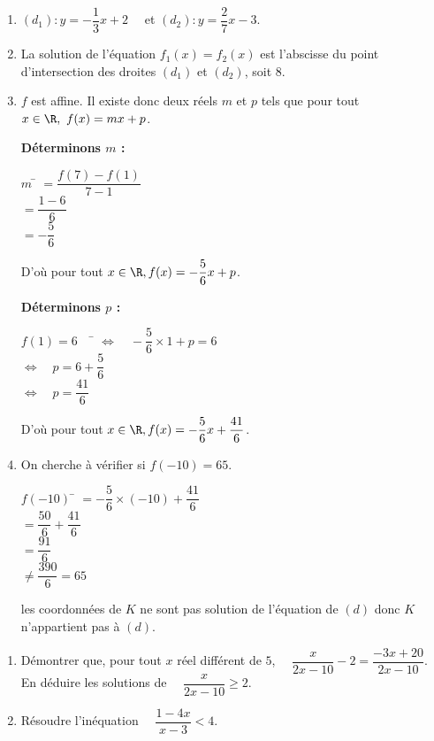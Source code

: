 \documentclass[a4paper,11pt,french]{article}
\begin{document}
\begin{exercicecorrection}
	\begin{enumerate}[\bfseries 1.]
		\item 	$(d_1):y=-\dfrac{1}{3}x+2 \quad$ et $(d_2):y=\dfrac{2}{7}x-3$.
		\item 	La solution de l'équation $f_1(x)=f_2(x)$ est l'abscisse du point d'intersection des droites $(d_1)$ et $(d_2)$, soit $8$.
		\item	$f$ est affine. Il existe donc deux réels $m$ et $p$ tels que pour tout $x\in\R, \ f(x)=mx+p$.
		\begin{multicols}{2}
			\textbf{Déterminons $m$ :}
			\begin{tabbing}
				$m$ 	\=  $=\dfrac{f(7)-f(1)}{7-1} $\\[.5em]
				\>  $= \dfrac{1-6}{6}$\\[.5em]
				\>	$= -\dfrac{5}{6}$
			\end{tabbing}
			D'où pour tout $x\in \R, f(x)=-\dfrac{5}{6}x+p$.
			
			\textbf{Déterminons $p$ :}
			\begin{tabbing}
				$f(1)=6 \quad$		\=	$\Leftrightarrow\quad -\dfrac{5}{6}\times1+p=6$\\
				\>	$\Leftrightarrow\quad p=6+\dfrac{5}{6} $\\
				\>	$\Leftrightarrow\quad p=\dfrac{41}{6}$
			\end{tabbing}
			D'où pour tout $x\in \R, f(x)=-\dfrac{5}{6}x+\dfrac{41}{6}$.
		\end{multicols}
		\item	On cherche à vérifier si $f(-10)=65$.
		\begin{tabbing}
			$f(-10)$ 	\=  $=-\dfrac{5}{6}\times(-10)+\dfrac{41}{6} $\\[.5em]
			\>  $= \dfrac{50}{6}+\dfrac{41}{6}$\\[.5em]
			\>	$= \dfrac{91}{6}$\\[.5em]
			\>	$\neq	\dfrac{390}{6}=65$
		\end{tabbing}
		les coordonnées de $K$ ne sont pas solution de l'équation de $(d)$ donc $K$ n'appartient pas à $(d)$.
	\end{enumerate}
\end{exercicecorrection}

\begin{exercice}[ (8 points)]
	\begin{enumerate}[\bfseries 1.]
		\item 	Démontrer que, pour tout $x$ réel différent de $5$, $\quad \dfrac{x}{2x-10}-2=\dfrac{-3x+20}{2x-10}$.\\
		En déduire les solutions de $\quad \dfrac{x}{2x-10}\geqslant2$.
		\item 	Résoudre l'inéquation $\quad \dfrac{1-4x}{x-3}<4$.
	\end{enumerate}
\end{exercice}
\end{document}
